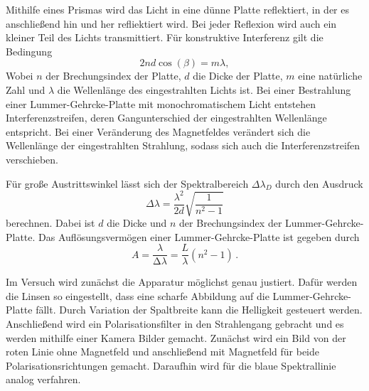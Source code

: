 Mithilfe eines Prismas wird das Licht in eine dünne Platte reflektiert, in der
es anschließend hin und her refliektiert wird. Bei jeder Reflexion wird auch ein kleiner
Teil des Lichts transmittiert. Für konstruktive Interferenz gilt die Bedingung
\begin{equation}
  2n d \cos(\beta)=m \lambda,
\end{equation}
Wobei $n$ der Brechungsindex der Platte, $d$ die Dicke der Platte, $m$ eine natürliche
Zahl und $\lambda$ die Wellenlänge des eingestrahlten Lichts ist. Bei einer Bestrahlung einer
Lummer-Gehrcke-Platte mit monochromatischem Licht entstehen Interferenzstreifen, deren
Gangunterschied der eingestrahlten Wellenlänge entspricht. Bei einer Veränderung
des Magnetfeldes verändert sich die Wellenlänge der eingestrahlten Strahlung, sodass
sich auch die Interferenzstreifen verschieben.

Für große Austrittswinkel lässt sich der Spektralbereich $\Delta \lambda_D$ durch
den Ausdruck
\begin{equation}
   \Delta \lambda = \frac{\lambda^2}{2d} \sqrt{\frac{1}{n^2-1}}
\end{equation}
berechnen. Dabei ist $d$ die Dicke und $n$ der Brechungsindex der Lummer-Gehrcke-Platte.
Das Auflösungsvermögen einer Lummer-Gehrcke-Platte ist gegeben durch
\begin{equation}
  A = \frac{\lambda}{\increment \lambda} = \frac{L}{\lambda}(n^2-1) \,.
\end{equation}

Im Versuch wird zunächst die Apparatur möglichst genau justiert. Dafür werden
die Linsen so eingestellt, dass eine scharfe Abbildung auf die Lummer-Gehrcke-Platte
fällt. Durch Variation der Spaltbreite kann die Helligkeit gesteuert werden.
Anschließend wird ein Polarisationsfilter in den Strahlengang gebracht und es werden
mithilfe einer Kamera Bilder gemacht. Zunächst wird ein Bild von der roten Linie ohne
Magnetfeld und anschließend mit Magnetfeld für beide Polarisationsrichtungen gemacht.
Daraufhin wird für die blaue Spektrallinie analog verfahren.
